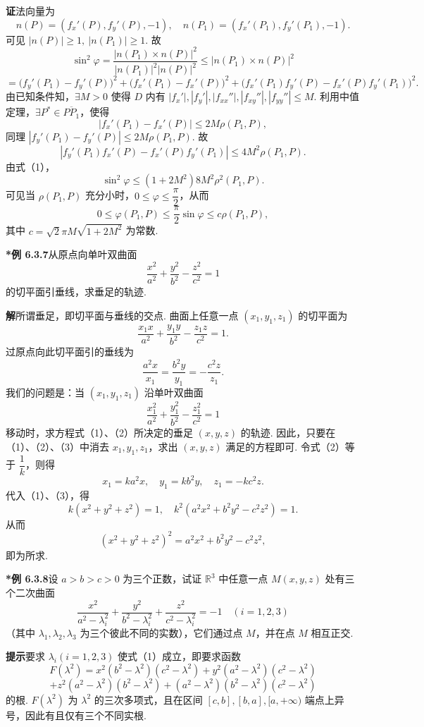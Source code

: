 \documentclass[UTF8,12pt,a4paper,fontset=fandol]{ctexart}
\begin{document}
\noindent\textbf{证}\quad 法向量为
\[
  n(P)=(f_x'(P),f_y'(P),-1),\quad
  n(P_1)=(f_x'(P_1),f_y'(P_1),-1).
\]
可见 $|n(P)|\ge1,\ |n(P_1)|\ge1$. 故
\[
  \sin^2\varphi
  =\frac{|n(P_1)\times n(P)|^2}{|n(P_1)|^2|n(P)|^2}
  \le |n(P_1)\times n(P)|^2
\]
\[
  =
  \bigl(f_y'(P_1)-f_y'(P)\bigr)^2+
  \bigl(f_x'(P_1)-f_x'(P)\bigr)^2+
  \bigl(f_x'(P_1)f_y'(P)-f_x'(P)f_y'(P_1)\bigr)^2. \tag{1}
\]
由已知条件知，$\exists M>0$ 使得 $D$ 内有 $|f_x'|,|f_y'|,|f_{xx}''|,|f_{xy}''|,|f_{yy}''|\le M$. 利用中值定理，$\exists P^*\in\overline{PP_1}$，使得
\[
  |f_x'(P_1)-f_x'(P)|
  \le2M\rho(P_1,P),
\]
同理 $|f_y'(P_1)-f_y'(P)|\le2M\rho(P_1,P)$. 故
\[
  |f_y'(P_1)f_x'(P)-f_x'(P)f_y'(P_1)|
  \le4M^2\rho(P_1,P).
\]
由式（1），
\[
  \sin^2\varphi\le(1+2M^2)8M^2\rho^2(P_1,P).
\]
可见当 $\rho(P_1,P)$ 充分小时，$0\le\varphi\le\dfrac\pi2$，从而
\[
  0\le\varphi(P_1,P)\le\frac\pi2\sin\varphi\le c\rho(P_1,P),
\]
其中 $c=\sqrt2\pi M\sqrt{1+2M^2}$ 为常数.

\noindent\textbf{*例 6.3.7}\quad 从原点向单叶双曲面
\[
  \frac{x^2}{a^2}+\frac{y^2}{b^2}-\frac{z^2}{c^2}=1
\]
的切平面引垂线，求垂足的轨迹.

\noindent\textbf{解}\quad 所谓垂足，即切平面与垂线的交点. 曲面上任意一点 $(x_1,y_1,z_1)$ 的切平面为
\[
  \frac{x_1x}{a^2}+\frac{y_1y}{b^2}-\frac{z_1z}{c^2}=1. \tag{1}
\]
过原点向此切平面引的垂线为
\[
  \frac{a^2x}{x_1}=\frac{b^2y}{y_1}=-\frac{c^2z}{z_1}. \tag{2}
\]
我们的问题是：当 $(x_1,y_1,z_1)$ 沿单叶双曲面
\[
  \frac{x_1^2}{a^2}+\frac{y_1^2}{b^2}-\frac{z_1^2}{c^2}=1 \tag{3}
\]
移动时，求方程式（1）、（2）所决定的垂足 $(x,y,z)$ 的轨迹. 因此，只要在（1）、（2）、（3）中消去 $x_1,y_1,z_1$，求出 $(x,y,z)$ 满足的方程即可. 令式（2）等于 $\dfrac1k$，则得
\[
  x_1=ka^2x,\quad y_1=kb^2y,\quad z_1=-kc^2z.
\]
代入（1）、（3），得
\[
  k(x^2+y^2+z^2)=1,\quad
  k^2(a^2x^2+b^2y^2-c^2z^2)=1.
\]
从而
\[
  (x^2+y^2+z^2)^2=a^2x^2+b^2y^2-c^2z^2,
\]
即为所求.

\noindent\textbf{*例 6.3.8}\quad 设 $a>b>c>0$ 为三个正数，试证 $\mathbb{R}^3$ 中任意一点 $M(x,y,z)$ 处有三个二次曲面
\[
  \frac{x^2}{a^2-\lambda_i^2}
  +\frac{y^2}{b^2-\lambda_i^2}
  +\frac{z^2}{c^2-\lambda_i^2}=-1
  \quad(i=1,2,3) \tag{1}
\]
（其中 $\lambda_1,\lambda_2,\lambda_3$ 为三个彼此不同的实数），它们通过点 $M$，并在点 $M$ 相互正交.

\noindent\textbf{提示}\quad 要求 $\lambda_i(i=1,2,3)$ 使式（1）成立，即要求函数
\[
  F(\lambda^2)=x^2(b^2-\lambda^2)(c^2-\lambda^2)
  +y^2(a^2-\lambda^2)(c^2-\lambda^2)
\]
\[
  +z^2(a^2-\lambda^2)(b^2-\lambda^2)
  +(a^2-\lambda^2)(b^2-\lambda^2)(c^2-\lambda^2)
\]
的根. $F(\lambda^2)$ 为 $\lambda^2$ 的三次多项式，且在区间 $[c,b],[b,a],[a,+\infty)$ 端点上异号，因此有且仅有三个不同实根.
\end{document}
